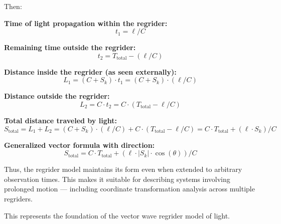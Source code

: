 \documentclass[12pt]{article}
\begin{document}
Then:

\textbf{Time of light propagation within the regrider:}
\[
t_1 = \ell / C
\]

\textbf{Remaining time outside the regrider:}
\[
t_2 = T_{\text{total}} - (\ell / C)
\]

\textbf{Distance inside the regrider (as seen externally):}
\[
L_1 = (C + S_k) \cdot t_1 = (C + S_k) \cdot (\ell / C)
\]

\textbf{Distance outside the regrider:}
\[
L_2 = C \cdot t_2 = C \cdot (T_{\text{total}} - \ell / C)
\]

\textbf{Total distance traveled by light:}
\[
S_{\text{total}} = L_1 + L_2 = (C + S_k) \cdot (\ell / C) + C \cdot (T_{\text{total}} - \ell / C) = C \cdot T_{\text{total}} + (\ell \cdot S_k) / C
\]

\textbf{Generalized vector formula with direction:}
\[
S_{\text{total}} = C \cdot T_{\text{total}} + (\ell \cdot \left|S_k\right| \cdot \cos(\theta)) / C
\]

Thus, the regrider model maintains its form even when extended to arbitrary observation times. This makes it suitable for describing systems involving prolonged motion — including coordinate transformation analysis across multiple regriders.

This represents the foundation of the vector wave regrider model of light.
\end{document}
